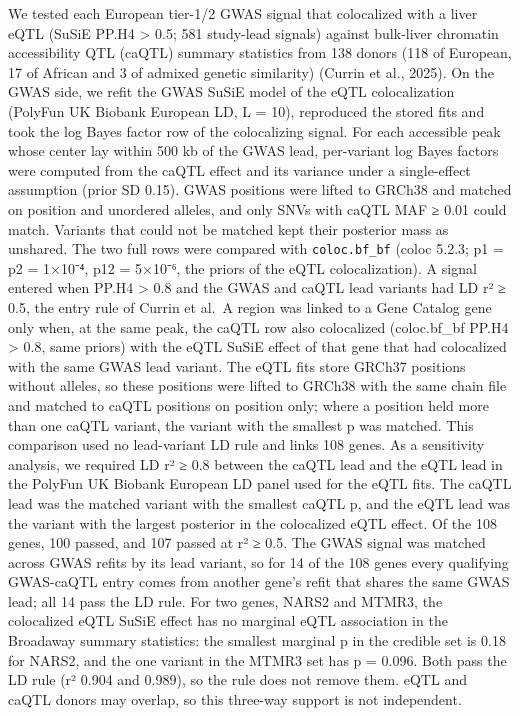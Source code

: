 We tested each European tier-1/2 GWAS signal that colocalized with a liver eQTL (SuSiE PP.H4 \textgreater{} 0.5; 581 study-lead signals) against bulk-liver chromatin accessibility QTL (caQTL) summary statistics from 138 donors (118 of European, 17 of African and 3 of admixed genetic similarity) (Currin et al., 2025). On the GWAS side, we refit the GWAS SuSiE model of the eQTL colocalization (PolyFun UK Biobank European LD, L = 10), reproduced the stored fits and took the log Bayes factor row of the colocalizing signal. For each accessible peak whose center lay within 500 kb of the GWAS lead, per-variant log Bayes factors were computed from the caQTL effect and its variance under a single-effect assumption (prior SD 0.15). GWAS positions were lifted to GRCh38 and matched on position and unordered alleles, and only SNVs with caQTL MAF ≥ 0.01 could match. Variants that could not be matched kept their posterior mass as unshared. The two full rows were compared with \texttt{coloc.bf\_\allowbreak{}bf} (coloc 5.2.3; p1 = p2 = 1×10⁻⁴, p12 = 5×10⁻⁶, the priors of the eQTL colocalization). A signal entered when PP.H4 \textgreater{} 0.8 and the GWAS and caQTL lead variants had LD r² ≥ 0.5, the entry rule of Currin et al.~A region was linked to a Gene Catalog gene only when, at the same peak, the caQTL row also colocalized (coloc.bf\_\allowbreak{}bf PP.H4 \textgreater{} 0.8, same priors) with the eQTL SuSiE effect of that gene that had colocalized with the same GWAS lead variant. The eQTL fits store GRCh37 positions without alleles, so these positions were lifted to GRCh38 with the same chain file and matched to caQTL positions on position only; where a position held more than one caQTL variant, the variant with the smallest p was matched. This comparison used no lead-variant LD rule and links 108 genes. As a sensitivity analysis, we required LD r² ≥ 0.8 between the caQTL lead and the eQTL lead in the PolyFun UK Biobank European LD panel used for the eQTL fits. The caQTL lead was the matched variant with the smallest caQTL p, and the eQTL lead was the variant with the largest posterior in the colocalized eQTL effect. Of the 108 genes, 100 passed, and 107 passed at r² ≥ 0.5. The GWAS signal was matched across GWAS refits by its lead variant, so for 14 of the 108 genes every qualifying GWAS-caQTL entry comes from another gene's refit that shares the same GWAS lead; all 14 pass the LD rule. For two genes, NARS2 and MTMR3, the colocalized eQTL SuSiE effect has no marginal eQTL association in the Broadaway summary statistics: the smallest marginal p in the credible set is 0.18 for NARS2, and the one variant in the MTMR3 set has p = 0.096. Both pass the LD rule (r² 0.904 and 0.989), so the rule does not remove them. eQTL and caQTL donors may overlap, so this three-way support is not independent.


